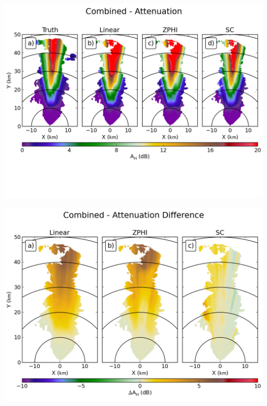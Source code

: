 \documentclass[red]{beamer}
\begin{document}
\begin{frame}
	\begin{center}
		\includegraphics[scale=0.55]{figures/C_Combined_Attenuation.png}
	\end{center}
\end{frame}

\begin{frame}
	\begin{center}
		\includegraphics[scale=0.45]{figures/C_Combined_Attenuation_Difference.png}
	\end{center}
\end{frame}
\end{document}
